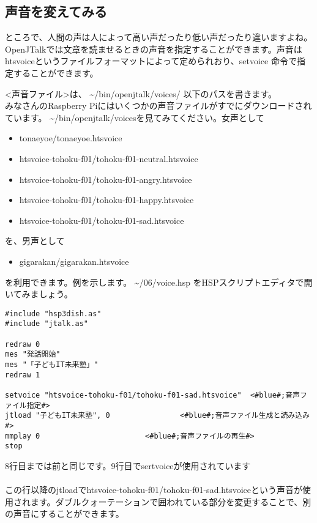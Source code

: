 \subsection{声音を変えてみる}
ところで、人間の声は人によって高い声だったり低い声だったり違いますよね。OpenJTalkでは文章を読ませるときの声音を指定することができます。声音はhtsvoiceというファイルフォーマットによって定められおり、setvoice 命令で指定することができます。\\

<声音ファイル>は、 \textasciitilde /bin/openjtalk/voices/ 以下のパスを書きます。\\
みなさんのRaspberry Piにはいくつかの声音ファイルがすでにダウンロードされています。  \textasciitilde /bin/openjtalk/voicesを見てみてください。女声として
\begin{itemize}
\item tonaeyoe/tonaeyoe.htsvoice
\item htsvoice-tohoku-f01/tohoku-f01-neutral.htsvoice
\item htsvoice-tohoku-f01/tohoku-f01-angry.htsvoice
\item htsvoice-tohoku-f01/tohoku-f01-happy.htsvoice
\item htsvoice-tohoku-f01/tohoku-f01-sad.htsvoice
\end{itemize}
を、男声として
\begin{itemize}
\item gigarakan/gigarakan.htsvoice
\end{itemize}
を利用できます。例を示します。 \textasciitilde /06/voice.hsp をHSPスクリプトエディタで開いてみましょう。\\

\begin{lstlisting}[caption=voice.hsp,label=voice.hsp]
#include "hsp3dish.as"
#include "jtalk.as"

redraw 0
mes "発話開始"
mes "「子どもIT未来塾」"
redraw 1

setvoice "htsvoice-tohoku-f01/tohoku-f01-sad.htsvoice"	<#blue#;音声ファイル指定#>
jtload "子どもIT未来塾", 0				<#blue#;音声ファイル生成と読み込み#>
mmplay 0						<#blue#;音声ファイルの再生#>
stop
\end{lstlisting}

8行目までは前と同じです。9行目でsertvoiceが使用されています\\
\\
この行以降のjtloadでhtsvoice-tohoku-f01/tohoku-f01-sad.htsvoiceという声音が使用されます。ダブルクォーテーションで囲われている部分を変更することで、別の声音にすることができます。\\

